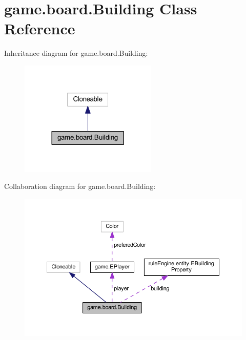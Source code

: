 \hypertarget{classgame_1_1board_1_1_building}{}\section{game.\+board.\+Building Class Reference}
\label{classgame_1_1board_1_1_building}


Inheritance diagram for game.\+board.\+Building\+:
\nopagebreak
\begin{figure}[H]
\begin{center}
\leavevmode
\includegraphics[width=185pt]{classgame_1_1board_1_1_building__inherit__graph}
\end{center}
\end{figure}


Collaboration diagram for game.\+board.\+Building\+:
\nopagebreak
\begin{figure}[H]
\begin{center}
\leavevmode
\includegraphics[width=350pt]{classgame_1_1board_1_1_building__coll__graph}
\end{center}
\end{figure}
